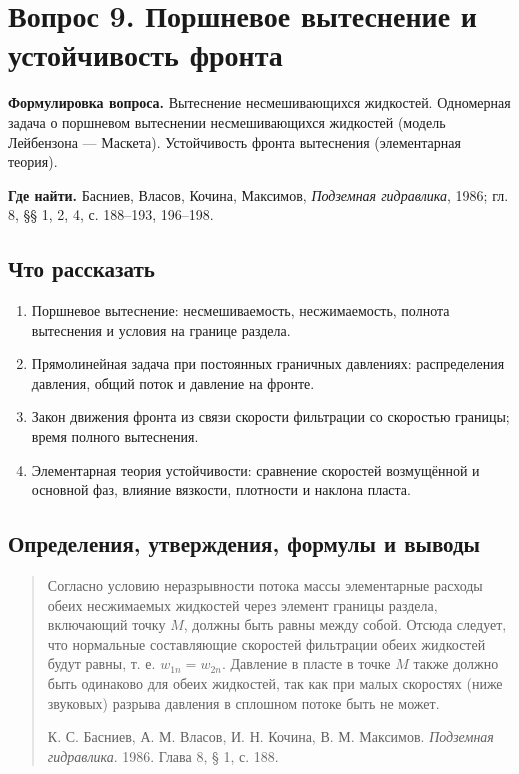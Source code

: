 \documentclass[12pt,a4paper]{article}
\newcounter{questionnumber}
\begin{document}
\clearpage
\setcounter{questionnumber}{9}
\setcounter{equation}{0}
\setcounter{footnote}{0}
\section*{Вопрос 9. Поршневое вытеснение и устойчивость фронта}
\textbf{Формулировка вопроса.} Вытеснение несмешивающихся жидкостей. Одномерная задача о поршневом вытеснении несмешивающихся жидкостей (модель Лейбензона — Маскета). Устойчивость фронта вытеснения (элементарная теория).

\medskip
\textbf{Где найти.} Басниев, Власов, Кочина, Максимов, \textit{Подземная гидравлика}, 1986; гл. 8, §§ 1, 2, 4, с. 188--193, 196--198.

\subsection*{Что рассказать}
\begin{enumerate}
\item Поршневое вытеснение: несмешиваемость, несжимаемость, полнота вытеснения и условия на границе раздела.
\item Прямолинейная задача при постоянных граничных давлениях: распределения давления, общий поток и давление на фронте.
\item Закон движения фронта из связи скорости фильтрации со скоростью границы; время полного вытеснения.
\item Элементарная теория устойчивости: сравнение скоростей возмущённой и основной фаз, влияние вязкости, плотности и наклона пласта.
\end{enumerate}
\subsection*{Определения, утверждения, формулы и выводы}
\begingroup

\begin{quote}\sloppy
Согласно условию неразрывности потока массы элементарные расходы обеих несжимаемых жидкостей через элемент границы раздела, включающий точку $M$, должны быть равны между собой. Отсюда следует, что нормальные составляющие скоростей фильтрации обеих жидкостей будут равны, т. е. $w_{1n}=w_{2n}$. Давление в пласте в точке $M$ также должно быть одинаково для обеих жидкостей, так как при малых скоростях (ниже звуковых) разрыва давления в сплошном потоке быть не может.
\par\nobreak\smallskip
{\small К. С. Басниев, А. М. Власов, И. Н. Кочина, В. М. Максимов. \textit{Подземная гидравлика}. 1986. Глава 8, § 1, с. 188.}\par
\end{quote}
\end{document}
